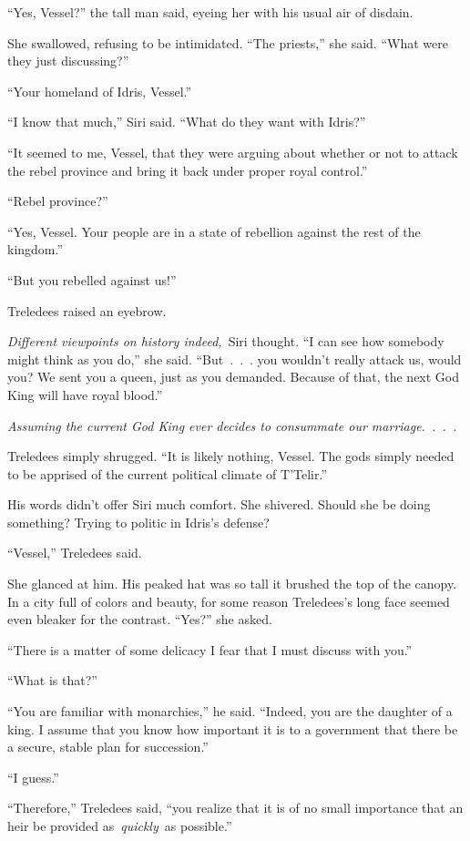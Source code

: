 “Yes, Vessel?” the tall man said, eyeing her with his usual air of disdain.

She swallowed, refusing to be intimidated. “The priests,” she said. “What were they just discussing?”

“Your homeland of Idris, Vessel.”

“I know that much,” Siri said. “What do they want with Idris?”

“It seemed to me, Vessel, that they were arguing about whether or not to attack the rebel province and bring it back under proper royal control.”

“Rebel province?”

“Yes, Vessel. Your people are in a state of rebellion against the rest of the kingdom.”

“But you rebelled against us!”

Treledees raised an eyebrow.

\textit{Different viewpoints on history indeed,}~Siri thought. “I can see how somebody might think as you do,” she said. “But~.~.~. you wouldn’t really attack us, would you? We sent you a queen, just as you demanded. Because of that, the next God King will have royal blood.”

\textit{Assuming the current God King ever decides to consummate our marriage.~.~.~.}

Treledees simply shrugged. “It is likely nothing, Vessel. The gods simply needed to be apprised of the current political climate of T’Telir.”

His words didn’t offer Siri much comfort. She shivered. Should she be doing something? Trying to politic in Idris’s defense?

“Vessel,” Treledees said.

She glanced at him. His peaked hat was so tall it brushed the top of the canopy. In a city full of colors and beauty, for some reason Treledees’s long face seemed even bleaker for the contrast. “Yes?” she asked.

“There is a matter of some delicacy I fear that I must discuss with you.”

“What is that?”

“You are familiar with monarchies,” he said. “Indeed, you are the daughter of a king. I assume that you know how important it is to a government that there be a secure, stable plan for succession.”

“I guess.”

“Therefore,” Treledees said, “you realize that it is of no small importance that an heir be provided as~\textit{quickly}~as possible.”

